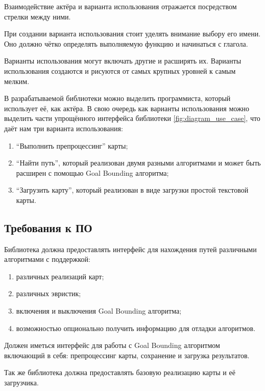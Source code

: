 Взаимодействие актёра и варианта использования отражается посредством стрелки между ними.

При создании варианта использования стоит уделять внимание выбору его имени. Оно должно чётко определять выполняемую функцию и начинаться с глагола. 

Варианты использования могут включать другие и расширять их. Варианты использования создаются и рисуются от самых крупных уровней к самым мелким.

В разрабатываемой библиотеки можно выделить программиста, который использует её, как актёра. В свою очередь как варианты использования можно выделить части упрощённого интерфейса библиотеки \cref{fig:diagram_use_case}, что даёт нам три варианта использования: 


\begin{enumerate}
	\item ``Выполнить препроцессинг'' карты;
	\item ``Найти путь'', который реализован двумя разными алгоритмами и может быть расширен с помощью Goal Bounding алгоритма;
	\item ``Загрузить карту'', который реализован в виде загрузки простой текстовой карты.
\end{enumerate}



\subsection{Требования к ПО}

Библиотека должна предоставлять интерфейс для нахождения путей различными алгоритмами с поддержкой:

\begin{enumerate}
	\item различных реализаций карт;
	\item различных эвристик;
	\item включения и выключения Goal Bounding алгоритма;
	\item возможностью опционально получить информацию для отладки алгоритмов.
\end{enumerate}

Должен иметься интерфейс для работы с Goal Bounding алгоритмом включающий в себя: препроцессинг карты, сохранение и загрузка результатов.

Так же библиотека должна предоставлять базовую реализацию карты и её загрузчика.


